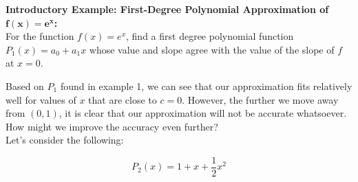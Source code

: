 \documentclass[addpoints, 12pt]{exam}
\begin{document}
\noindent\textbf{Introductory Example: First-Degree Polynomial Approximation of $\mathbf{f(x)=e^{x}}$: }\\
For the function $f(x)=e^x$, find a first degree polynomial function $P_1(x)=a_0+a_1 x$ whose value and slope agree with the value of the slope of $f$ at $x=0$.





\newpage

Based on $P_1$ found in example 1, we can see that our approximation fits relatively well for values of $x$ that are close to $c=0$. However, the further we move away from $(0,1)$, it is clear that our approximation will not be accurate whatsoever. How might we improve the accuracy even further?\\

Let's consider the following:

\begin{minipage}{0.45\linewidth}
    \[P_2(x)=1+x+\frac{1}{2}x^2\]
\end{minipage}
\hfill
\begin{minipage}{0.45\linewidth}
\end{minipage}
\end{document}
